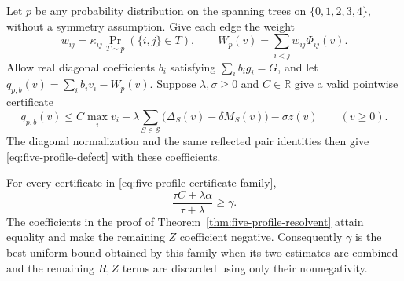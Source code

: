 Let $p$ be any probability distribution on the spanning trees on
$\{0,1,2,3,4\}$, without a symmetry assumption.  Give each edge the
weight
\[
 w_{ij}=\kappa_{ij}\Pr_{T\sim p}(\{i,j\}\in T),\qquad
 W_p(v)=\sum_{i<j}w_{ij}\Phi_{ij}(v).
\]
Allow real diagonal coefficients $b_i$ satisfying
$\sum_i b_i g_i=G$, and let
$q_{p,b}(v)=\sum_i b_i v_i-W_p(v)$.
Suppose $\lambda,\sigma\ge0$ and $C\in\mathbb R$ give a valid
pointwise certificate
\begin{equation}\label{eq:five-profile-certificate-family}
 q_{p,b}(v)\le C\max_i v_i
 -\lambda\sum_{S\in\mathcal S}
       \bigl(\Delta_S(v)-\delta M_S(v)\bigr)-\sigma z(v)
 \qquad(v\ge0).
\end{equation}
The diagonal normalization and the same reflected pair identities
then give \eqref{eq:five-profile-defect} with these coefficients.

\begin{proposition}\label{prop:five-profile-certificate-barrier}
For every certificate in
\eqref{eq:five-profile-certificate-family},
\[
 \frac{\tau C+\lambda\alpha}{\tau+\lambda}\ge\gamma.
\]
The coefficients in the proof of
Theorem~\ref{thm:five-profile-resolvent} attain equality and make the
remaining $Z$ coefficient negative.  Consequently $\gamma$ is the
best uniform bound obtained by this family when its two estimates
are combined and the remaining $R,Z$ terms are discarded using
only their nonnegativity.
\end{proposition}

